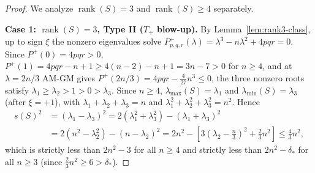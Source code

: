 \documentclass[11pt,reqno]{article}
\theoremstyle{definition}
\newcommand{\rank}{\operatorname{rank}}
\begin{document}
\begin{proof}
We analyze $\rank(S) = 3$ and $\rank(S) \ge 4$ separately.

\medskip\noindent\textbf{Case 1: $\rank(S) = 3$, Type II ($T_+$ blow-up).}
By Lemma~\ref{lem:rank3-class}, up to sign $\xi$ the nonzero eigenvalues solve $P^+_{p,q,r}(\lambda) = \lambda^3 - n\lambda^2 + 4pqr = 0$. Since $P^+(0) = 4pqr > 0$, $P^+(1) = 4pqr - n + 1 \ge 4(n-2) - n + 1 = 3n - 7 > 0$ for $n \ge 4$, and at $\lambda = 2n/3$ AM-GM gives $P^+(2n/3) = 4pqr - \frac{4}{27}n^3 \le 0$, the three nonzero roots satisfy $\lambda_1 \ge \lambda_2 > 1 > 0 > \lambda_3$. Since $n \ge 4$, $\lambda_{\max}(S) = \lambda_1$ and $\lambda_{\min}(S) = \lambda_3$ (after $\xi = +1$), with $\lambda_1 + \lambda_2 + \lambda_3 = n$ and $\lambda_1^2 + \lambda_2^2 + \lambda_3^2 = n^2$. Hence
\begin{align*}
s(S)^2 &= (\lambda_1 - \lambda_3)^2 = 2(\lambda_1^2 + \lambda_3^2) - (\lambda_1 + \lambda_3)^2 \\
&= 2(n^2 - \lambda_2^2) - (n - \lambda_2)^2
= 2n^2 - \left[3\left(\lambda_2 - \frac{n}{3}\right)^2 + \frac{2}{3}n^2\right]
\le \frac{4}{3}n^2,
\end{align*}
which is strictly less than $2n^2 - 3$ for all $n \ge 4$ and strictly less than $2n^2 - \delta_*$ for all $n \ge 3$ (since $\frac{2}{3}n^2 \ge 6 > \delta_*$).


\end{proof}
\end{document}
